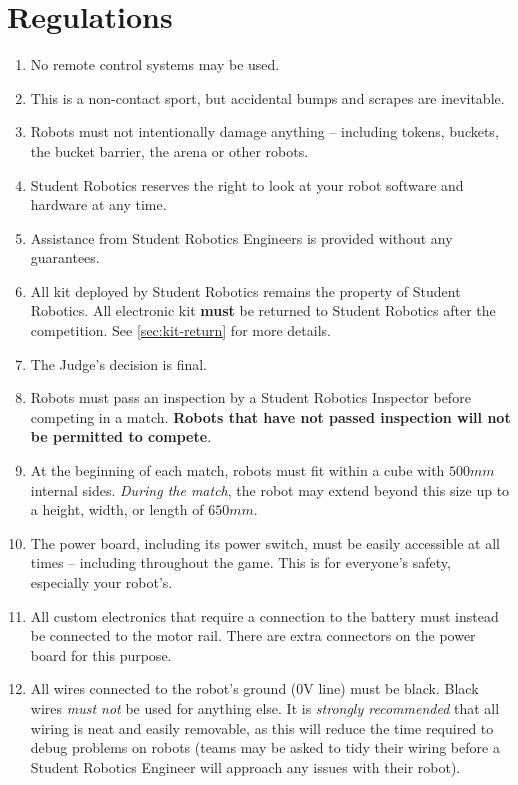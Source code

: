 \section {Regulations}
\label{sec:Regulations}

\begin{enumerate}


\item No remote control systems may be used.
\item This is a non-contact sport, but accidental bumps and scrapes are inevitable.
\item Robots must not intentionally damage anything -- including tokens, buckets, the bucket barrier, the arena or other robots.
\item Student Robotics reserves the right to look at your robot software and hardware at any time.
\item Assistance from Student Robotics Engineers is provided without any guarantees.
\item All kit deployed by Student Robotics remains the property of Student Robotics.
 All electronic kit \textbf{must} be returned to Student Robotics after the competition. See \autoref{sec:kit-return} for more details.
\item The Judge's decision is final.


\item Robots must pass an inspection by a Student Robotics Inspector before competing in a match.
 \textbf{Robots that have not passed inspection will not be permitted to compete}.

\item At the beginning of each match, robots must fit within a cube with $500mm$ internal sides.  \textit{During the match}, the robot may extend beyond this size up to a height, width, or length of $650mm$.

\item The power board, including its power switch, must be easily accessible at all times -- including throughout the game.  This is for everyone's safety, especially your robot's.

\item All custom electronics that require a connection to the battery must instead be connected to the motor rail.
 There are extra connectors on the power board for this purpose.

\item All wires connected to the robot's ground (0V line) must be black.
 Black wires \emph{must not} be used for anything else.
 It is \emph{strongly recommended} that all wiring is neat and easily removable, as this will reduce the time required to debug problems on robots
  (teams may be asked to tidy their wiring before a Student Robotics Engineer will approach any issues with their robot).


\end{enumerate}
